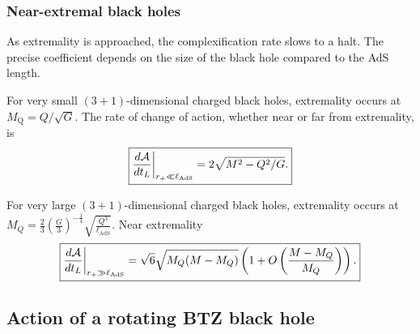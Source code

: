 \documentclass[12pt]{article}
\numberwithin{equation}{section}
\def\CA{{\cal A}}
\newcommand{\lads}{\ell_{\text{AdS}}}
\begin{document}
 \subsubsection*{Near-extremal black holes}

 As extremality is approached, the complexification rate slows to a halt. The precise coefficient depends on the size of the black hole compared to the AdS length.



For very small  $(3+1)$-dimensional  charged black holes, extremality occurs at $M_\textrm{Q} = Q/\sqrt{G}$. The rate of change of action, whether near or far from extremality, is
\begin{equation}
\boxed{\frac{d \CA}{dt_L} \bigg|_{r_+ \ll \lads}  = 2 \sqrt{M^2 - Q^2/G} .}
\label{small-action}
\end{equation}

For very large  $(3+1)$-dimensional  charged black holes, extremality occurs at {$M_Q =\frac{2}{3} \left(\frac{G}{3} \right)^{-\frac{1}{4}  }\sqrt{ \frac{Q^3}{\lads}}$}. Near extremality
\begin{equation}
\boxed{\frac{d \CA}{dt_L}  \bigg|_{r_+ \gg \lads} = \sqrt{6} \sqrt{M_Q (M - M_Q)} \left( 1+ O\left( \frac{M - M_Q}{M_Q} \right) \right) .}
\label{3.15}
\end{equation}








\subsection{Action of a rotating BTZ black hole}\label{subsec-rotating}
\end{document}
